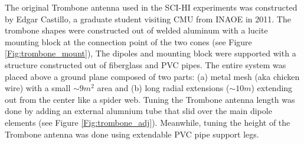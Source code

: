 The original Trombone antenna used in the SCI-HI experiments was constructed by Edgar Castillo, a graduate student visiting CMU from INAOE in 2011. The trombone shapes were constructed out of welded aluminum with a lucite mounting block at the connection point of the two cones (see Figure \ref{Fig:trombone_mount}), The dipoles and mounting block were supported with a structure constructed out of fiberglass and PVC pipes. The entire system was placed above a ground plane composed of two parts: (a) metal mesh (aka chicken wire) with a small $\sim9 m^2$ area and (b) long radial extensions ($\sim10 m$) extending out from the center like a spider web. Tuning the Trombone antenna length was done by adding an external alumnium tube that slid over the main dipole elements (see Figure \ref{Fig:trombone_adj}). Meanwhile, tuning the height of the Trombone antenna was done using extendable PVC pipe support legs.

